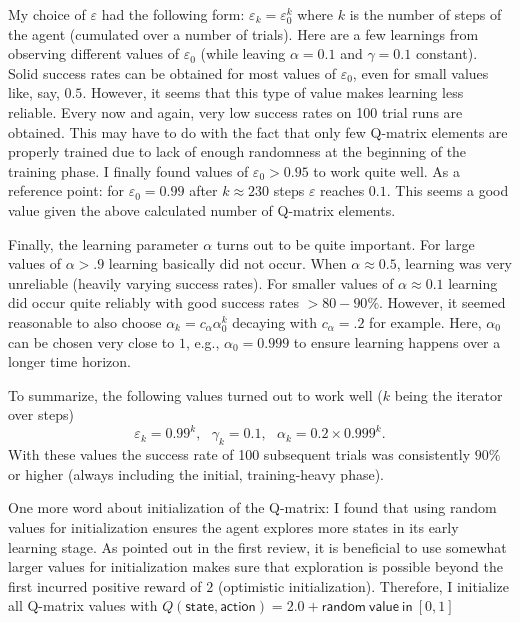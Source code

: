 \documentclass[a4paper,11pt]{article}
\numberwithin{equation}{section}
\numberwithin{figure}{section}
\begin{document}
My choice of $\varepsilon$ had the following form: $\varepsilon_k = \varepsilon_0^k$ where $k$ is the number of steps of the agent (cumulated over a number of trials). Here are a few learnings from observing different values of $\varepsilon_0$ (while leaving $\alpha=0.1$ and $\gamma=0.1$ constant). Solid success rates can be obtained for most values of $\varepsilon_0$, even for small values like, say, $0.5$. However, it seems that this type of value makes learning less reliable. Every now and again, very low success rates on 100 trial runs are obtained. This may have to do with the fact that only few Q-matrix elements are properly trained due to lack of enough randomness at the beginning of the training phase. I finally found values of $\varepsilon_0>0.95 $ to work quite well. As a reference point: for $\varepsilon_0=0.99$ after $k\approx 230$ steps $\varepsilon$ reaches $0.1$. This seems a good value given the above calculated number of Q-matrix elements.

Finally, the learning parameter $\alpha$ turns out to be quite important. For large values of $\alpha > .9$ learning basically did not occur. When $\alpha\approx 0.5$, learning was very unreliable (heavily varying success rates). For smaller values of $\alpha \approx 0.1$ learning did occur quite reliably with good success rates $>80-90\%$. However, it seemed reasonable to also choose $\alpha_k = c_\alpha\alpha_0^k$ decaying with $c_\alpha=.2$ for example. Here, $\alpha_0$ can be chosen very close to $1$, e.g., $\alpha_0=0.999$ to ensure learning happens over a longer time horizon.

To summarize, the following values turned out to work well ($k$ being the iterator over steps)
\begin{equation*}
\varepsilon_k =  0.99^k, \ \ \ \gamma_k = 0.1,\ \ \ \alpha_k = 0.2\times 0.999^k.
\end{equation*}
With these values the success rate of 100 subsequent trials was consistently $90\%$ or higher (always including the initial, training-heavy phase). 

One more word about initialization of the Q-matrix: I found that using random values for initialization ensures the agent explores more states in its early learning stage. As pointed out in the first review, it is beneficial to use somewhat larger values for initialization makes sure that exploration is possible beyond the first incurred positive reward of $2$ (optimistic initialization). Therefore, I initialize all Q-matrix values with $Q(\mathsf{state, action}) = 2.0 + \mathsf{random\ value\ in\ } [0, 1]$
\\ \\
\end{document}
